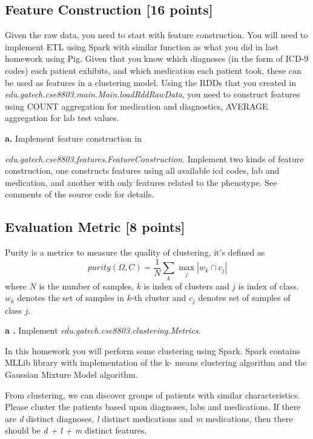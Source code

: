 \documentclass[12pt]{article}
\begin{document}
\subsection{Feature Construction [16 points]}
Given the raw data, you need to start with feature construction. You will need to implement ETL using Spark with similar function as what you did in last homework using Pig. Given that you know which diagnoses (in the form of ICD-9 codes) each patient exhibits, and which medication each patient took, these can be used as features in a clustering model. Using the RDDs that you created in \textit{edu.gatech.cse8803.main.Main.loadRddRawData}, you need to construct features using COUNT aggregation for medication and diagnostics, AVERAGE aggregation for lab test values.

\textbf{a. }Implement feature construction in

\textit{edu.gatech.cse8803.features.FeatureConstruction}. Implement two kinds of feature construction, one constructs features using all available icd codes, lab and medication, and another with only features related to the phenotype. See comments of the source code for details.

\subsection{Evaluation Metric [8 points]}
Purity is a metrics to measure the quality of clustering, it's defined as
$$
purity(\Omega, C) = \frac{1}{N}\sum_k \max_j |w_k \cap c_j|
$$
 where $N$ is the number of samples, $k$ is index of clusters and $j$ is index of class. $w_k$ denotes the set of samples in $k$-th cluster and $c_j$ denotes set of samples of class $j$.
 
\textbf{a .} Implement \textit{edu.gatech.cse8803.clustering.Metrics}. 

In this homework you will perform some clustering using Spark. Spark contains MLLib library with implementation of the k- means clustering algorithm and the Gaussian Mixture Model algorithm. 

From clustering, we can discover groups of patients with similar characteristics. Please cluster the patients based upon diagnoses, labs and medications. If there are \textit{d} distinct diagnoses, \textit{l} distinct medications and \textit{m} medications, then there should be \textit{d + l + m} distinct features.
\end{document}
